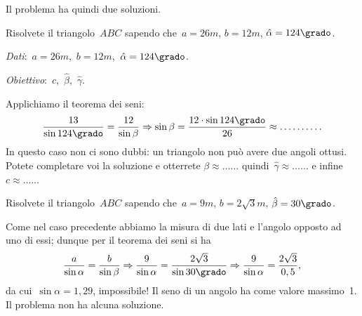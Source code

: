 

Il problema ha quindi due soluzioni.
\begin{problema}
Risolvete il triangolo~\(ABC\) sapendo che~\(a= 26\unit{m}\), \(b= 12\unit{m}\), 
\({\hat{\alpha}}=124\grado\).
\end{problema}

\emph{Dati}:~\(a= 26\unit{m}\),\quad~\(b= 
12\unit{m}\),\quad~\({\hat{\alpha}}=124\grado\).

\emph{Obiettivo}:~\(c\),\quad~\(\hat{\beta}\),\quad~\(\hat{\gamma}\).

Applichiamo il teorema dei seni:
\[\frac{13}{\sin 124\grado}=\frac{12}{\sin \beta}\Rightarrow \sin 
\beta=\frac{12\cdot\sin 124\grado}{26}\approx\ldots \ldots \ldots.\]
In questo caso non ci sono dubbi: un triangolo non può avere due angoli 
ottusi. 
Potete completare voi la soluzione e otterrete
\({\beta}{\approx}\ldots\ldots\) quindi~\({\hat{\gamma}}{\approx} \ldots\ldots\) 
e 
infine~\(c{\approx}\ldots\ldots\)

\begin{problema}
Risolvete il triangolo~\(ABC\) sapendo che~\(a= 9\unit{m}\), \(b=2 \sqrt 
3\unit{m}\), 
\({\hat{\beta}}=30\grado\).
\end{problema}
Come nel caso precedente abbiamo la misura di due lati e l'angolo opposto ad 
uno 
di essi; dunque per il teorema dei seni si ha
\[\frac{a}{\sin \alpha}=\frac{b}{\sin \beta} \Rightarrow \frac{9}{\sin 
\alpha}=\frac{2\sqrt{3}}{\sin 30\grado} \Rightarrow \frac{9}{\sin 
\alpha}=\frac{2\sqrt{3}}{0,5},\]
da cui~\(\sin  \alpha=1,29\), impossibile! Il seno di un angolo ha come valore 
massimo~1.
Il problema non ha alcuna soluzione.


